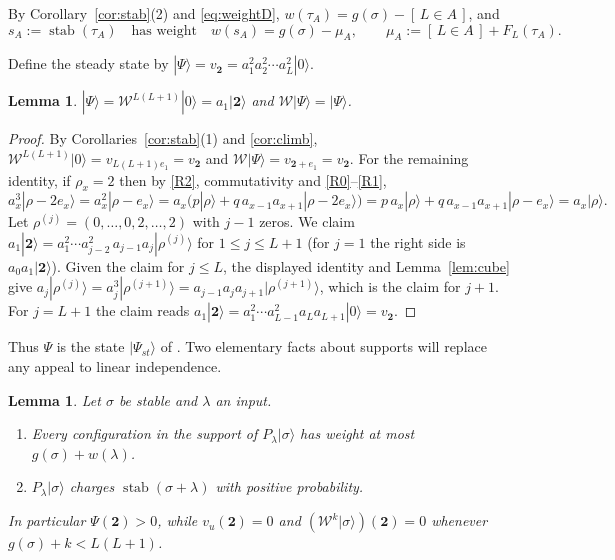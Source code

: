 \documentclass[11pt]{amsart}
\newtheorem{lemma}[theorem]{Lemma}
\theoremstyle{definition}
\theoremstyle{remark}
\newcommand{\cW}{\mathcal{W}}
\newcommand{\stab}{\operatorname{stab}}
\newcommand{\ket}[1]{|#1\rangle}
\newcommand{\two}{\mathbf{2}}
\newcommand{\Ind}[1]{[\,#1\,]}
\begin{document}
By Corollary~\ref{cor:stab}(2) and \eqref{eq:weightD}, $w(\tau_A)=g(\sigma)-\Ind{L\in A}$, and
\begin{equation}\label{eq:sA}
s_A:=\stab(\tau_A)\quad\text{has weight}\quad w(s_A)=g(\sigma)-\mu_A,\qquad \mu_A:=\Ind{L\in A}+F_L(\tau_A).
\end{equation}

Define the steady state by $\ket\Psi=v_\two=a_1^2a_2^2\cdots a_L^2\ket0$.

\begin{lemma}\label{lem:Psi}
$\ket\Psi=\cW^{L(L+1)}\ket0=a_1\ket\two$ and $\cW\ket\Psi=\ket\Psi$.
\end{lemma}

\begin{proof}
By Corollaries~\ref{cor:stab}(1) and \ref{cor:climb}, $\cW^{L(L+1)}\ket0=v_{L(L+1)e_1}=v_\two$ and $\cW\ket\Psi=v_{\two+e_1}=v_\two$. For the remaining identity, if $\rho_x=2$ then by \eqref{R2}, commutativity and \eqref{R0}--\eqref{R1},
\[
a_x^3\ket{\rho-2e_x}=a_x^2\ket{\rho-e_x}=a_x\bigl(p\ket\rho+q\,a_{x-1}a_{x+1}\ket{\rho-2e_x}\bigr)=p\,a_x\ket\rho+q\,a_{x-1}a_{x+1}\ket{\rho-e_x}=a_x\ket\rho .
\]
Let $\rho^{(j)}=(0,\dots,0,2,\dots,2)$ with $j-1$ zeros. We claim $a_1\ket\two=a_1^2\cdots a_{j-2}^2\,a_{j-1}a_j\ket{\rho^{(j)}}$ for $1\le j\le L+1$ (for $j=1$ the right side is $a_0a_1\ket\two$). Given the claim for $j\le L$, the displayed identity and Lemma~\ref{lem:cube} give $a_j\ket{\rho^{(j)}}=a_j^3\ket{\rho^{(j+1)}}=a_{j-1}a_ja_{j+1}\ket{\rho^{(j+1)}}$, which is the claim for $j+1$. For $j=L+1$ the claim reads $a_1\ket\two=a_1^2\cdots a_{L-1}^2a_La_{L+1}\ket0=v_\two$.
\end{proof}

Thus $\Psi$ is the state $\ket{\Psi_{st}}$ of \cite{Dha04}. Two elementary facts about supports will replace any appeal to linear independence.

\begin{lemma}\label{lem:supp}
Let $\sigma$ be stable and $\lambda$ an input.
\begin{enumerate}
\item Every configuration in the support of $P_\lambda\ket\sigma$ has weight at most $g(\sigma)+w(\lambda)$.
\item $P_\lambda\ket\sigma$ charges $\stab(\sigma+\lambda)$ with positive probability.
\end{enumerate}
In particular $\Psi(\two)>0$, while $v_u(\two)=0$ and $(\cW^k\ket\sigma)(\two)=0$ whenever $g(\sigma)+k<L(L+1)$.
\end{lemma}
\end{document}
